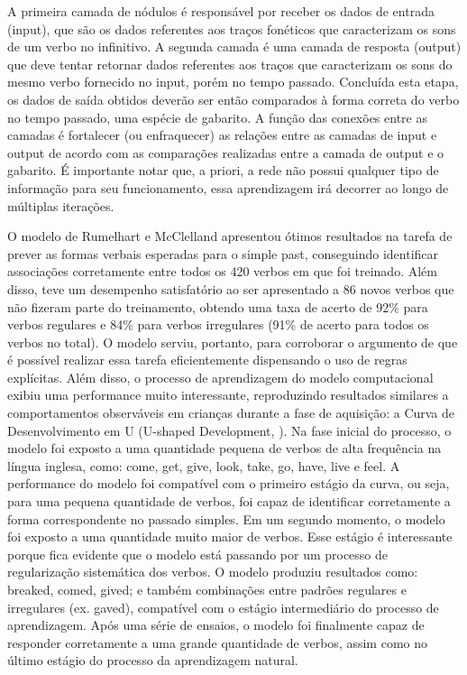A primeira camada de nódulos é responsável por receber os dados de entrada (input), que são os dados referentes aos traços fonéticos que caracterizam os sons de um verbo no infinitivo. A segunda camada é uma camada de resposta (output) que deve tentar retornar dados referentes aos traços que caracterizam os sons do mesmo verbo fornecido no input, porém no tempo passado. Concluída esta etapa, os dados de saída obtidos deverão ser então comparados à forma correta do verbo no tempo passado, uma espécie de gabarito. A função das conexões entre as camadas é fortalecer (ou enfraquecer) as relações entre as camadas de input e output de acordo com as comparações realizadas entre a camada de output e o gabarito. É importante notar que, a priori, a rede não possui qualquer tipo de informação para seu funcionamento, essa aprendizagem irá decorrer ao longo de múltiplas iterações.

O modelo de Rumelhart e McClelland apresentou ótimos resultados na tarefa de prever as formas verbais esperadas para o simple past, conseguindo identificar associações corretamente entre todos os 420 verbos em que foi treinado. Além disso, teve um desempenho satisfatório ao ser apresentado a 86 novos verbos que não fizeram parte do treinamento, obtendo uma taxa de acerto de 92\% para verbos regulares e 84\% para verbos irregulares (91\% de acerto para todos os verbos no total). O modelo serviu, portanto, para corroborar o argumento de que é possível realizar essa tarefa eficientemente dispensando o uso de regras explícitas. Além disso, o processo de aprendizagem do modelo computacional exibiu uma performance muito interessante, reproduzindo resultados similares a comportamentos observáveis em crianças durante a fase de aquisição: a Curva de Desenvolvimento em U (U-shaped Development, \cite{marcus:1992}). Na fase inicial do processo, o modelo foi exposto a uma quantidade pequena de verbos de alta frequência na língua inglesa, como: come, get, give, look, take, go, have, live e feel. A performance do modelo foi compatível com o primeiro estágio da curva, ou seja, para uma pequena quantidade de verbos, foi capaz de identificar corretamente a forma correspondente no passado simples. Em um segundo momento, o modelo foi exposto a uma quantidade muito maior de verbos. Esse estágio é interessante porque fica evidente que o modelo está passando por um processo de regularização sistemática dos verbos. O modelo produziu resultados como: breaked, comed, gived; e também combinações entre padrões regulares e irregulares (ex. gaved),  compatível com o estágio intermediário do processo de aprendizagem. Após uma série de ensaios, o modelo foi finalmente capaz de responder corretamente a uma grande quantidade de verbos, assim como no último estágio do processo da aprendizagem natural. 

